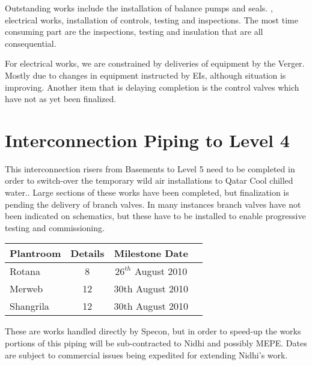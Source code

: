  
  



Outstanding works include the installation of balance pumps and seals. , electrical works, installation of controls, testing and inspections. The most time consuming part are the inspections, testing and insulation that are all consequential.

For electrical works, we are constrained by deliveries of equipment by the Verger. Mostly due to changes in equipment instructed by EIs, although situation is improving.
Another item that is delaying completion is the control valves which have not as yet been finalized. 


\section{Interconnection Piping to Level 4}

This interconnection risers from Basements to Level 5 need to be  completed in order to switch-over the temporary wild air installations to Qatar Cool chilled water.. Large sections of these works have been completed, but finalization is pending the delivery of branch valves. In many instances branch valves have not been indicated on schematics, but these have to be installed to enable progressive testing and commissioning.
\begin{center} 
    \begin{tabular}{lccl}
      \toprule
      Plantroom   &  Details & Milestone Date  \\
      \midrule
      Rotana       &  8   &  $26^{th}$ August 2010  \\
      Merweb      &  12 &  30th August 2010  \\
      Shangrila    &  12 &  30th August 2010  \\
      \bottomrule
    \end{tabular}
 
  \end{center}
  

These are works handled directly by Specon, but in order to speed-up the works portions of this piping will be sub-contracted to Nidhi and possibly MEPE. Dates are subject to commercial issues being expedited for extending Nidhi's work.


